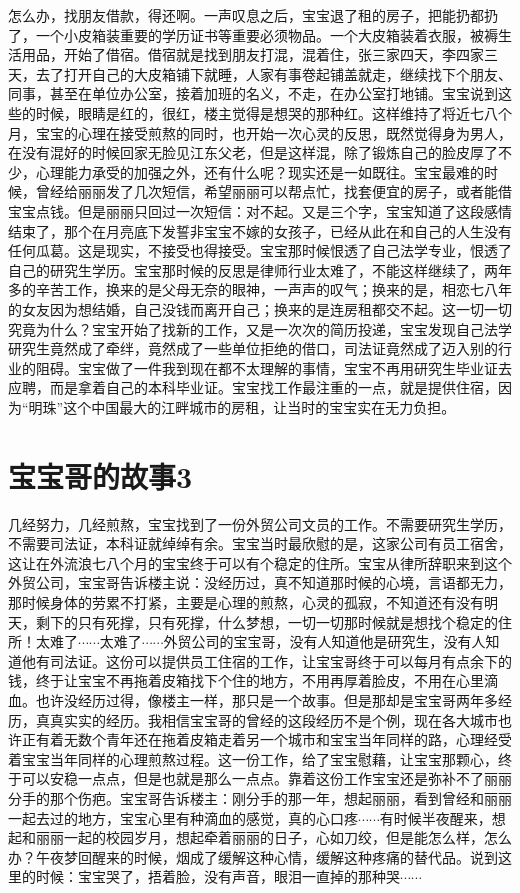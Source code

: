 怎么办，找朋友借款，得还啊。一声叹息之后，宝宝退了租的房子，把能扔都扔了，一个小皮箱装重要的学历证书等重要必须物品。一个大皮箱装着衣服，被褥生活用品，开始了借宿。借宿就是找到朋友打混，混着住，张三家四天，李四家三天，去了打开自己的大皮箱铺下就睡，人家有事卷起铺盖就走，继续找下个朋友、同事，甚至在单位办公室，接着加班的名义，不走，在办公室打地铺。宝宝说到这些的时候，眼睛是红的，很红，楼主觉得是想哭的那种红。这样维持了将近七八个月，宝宝的心理在接受煎熬的同时，也开始一次心灵的反思，既然觉得身为男人，在没有混好的时候回家无脸见江东父老，但是这样混，除了锻炼自己的脸皮厚了不少，心理能力承受的加强之外，还有什么呢？现实还是一如既往。宝宝最难的时候，曾经给丽丽发了几次短信，希望丽丽可以帮点忙，找套便宜的房子，或者能借宝宝点钱。但是丽丽只回过一次短信：对不起。又是三个字，宝宝知道了这段感情结束了，那个在月亮底下发誓非宝宝不嫁的女孩子，已经从此在和自己的人生没有任何瓜葛。这是现实，不接受也得接受。宝宝那时候恨透了自己法学专业，恨透了自己的研究生学历。宝宝那时候的反思是律师行业太难了，不能这样继续了，两年多的辛苦工作，换来的是父母无奈的眼神，一声声的叹气；换来的是，相恋七八年的女友因为想结婚，自己没钱而离开自己；换来的是连房租都交不起。这一切一切究竟为什么？宝宝开始了找新的工作，又是一次次的简历投递，宝宝发现自己法学研究生竟然成了牵绊，竟然成了一些单位拒绝的借口，司法证竟然成了迈入别的行业的阻碍。宝宝做了一件我到现在都不太理解的事情，宝宝不再用研究生毕业证去应聘，而是拿着自己的本科毕业证。宝宝找工作最注重的一点，就是提供住宿，因为“明珠”这个中国最大的江畔城市的房租，让当时的宝宝实在无力负担。

\section{宝宝哥的故事3}

几经努力，几经煎熬，宝宝找到了一份外贸公司文员的工作。不需要研究生学历，不需要司法证，本科证就绰绰有余。宝宝当时最欣慰的是，这家公司有员工宿舍，这让在外流浪七八个月的宝宝终于可以有个稳定的住所。宝宝从律所辞职来到这个外贸公司，宝宝哥告诉楼主说：没经历过，真不知道那时候的心境，言语都无力，那时候身体的劳累不打紧，主要是心理的煎熬，心灵的孤寂，不知道还有没有明天，剩下的只有死撑，只有死撑，什么梦想，一切一切那时候就是想找个稳定的住所！太难了$\cdots\cdots$太难了$\cdots\cdots$外贸公司的宝宝哥，没有人知道他是研究生，没有人知道他有司法证。这份可以提供员工住宿的工作，让宝宝哥终于可以每月有点余下的钱，终于让宝宝不再拖着皮箱找下个住的地方，不用再厚着脸皮，不用在心里滴血。也许没经历过得，像楼主一样，那只是一个故事。但是那却是宝宝哥两年多经历，真真实实的经历。我相信宝宝哥的曾经的这段经历不是个例，现在各大城市也许正有着无数个青年还在拖着皮箱走着另一个城市和宝宝当年同样的路，心理经受着宝宝当年同样的心理煎熬过程。这一份工作，给了宝宝慰藉，让宝宝那颗心，终于可以安稳一点点，但是也就是那么一点点。靠着这份工作宝宝还是弥补不了丽丽分手的那个伤疤。宝宝哥告诉楼主：刚分手的那一年，想起丽丽，看到曾经和丽丽一起去过的地方，宝宝心里有种滴血的感觉，真的心口疼$\cdots\cdots$有时候半夜醒来，想起和丽丽一起的校园岁月，想起牵着丽丽的日子，心如刀绞，但是能怎么样，怎么办？午夜梦回醒来的时候，烟成了缓解这种心情，缓解这种疼痛的替代品。说到这里的时候：宝宝哭了，捂着脸，没有声音，眼泪一直掉的那种哭$\cdots\cdots$

